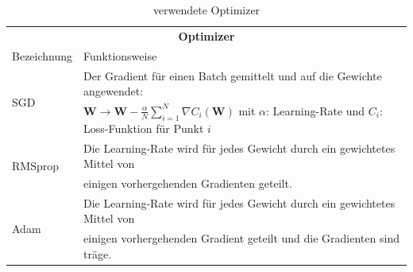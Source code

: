 \begin{table}

	\centering
	\begin{tabular}{ll}
		\multicolumn{2}{c}{\textbf{Optimizer}} \\
		Bezeichnung & Funktionsweise \\
		\hline
		\multirow{2}{*}{SGD}& Der Gradient für einen Batch gemittelt und auf die Gewichte angewendet:\\
		&  $\textbf{W} \rightarrow \textbf{W} - \frac{\alpha}{N}\sum_{i=1}^{N}\nabla C_i(\textbf{W})$ mit $\alpha$: Learning-Rate und $C_i$: Loss-Funktion für Punkt $i$ \\[5pt]
		\multirow{2}{*}{RMSprop\cite{RMSprop}} & Die Learning-Rate wird für jedes Gewicht durch ein gewichtetes Mittel von \\
		& einigen vorhergehenden Gradienten geteilt. \\[5pt]
		\multirow{2}{*}{Adam\cite{Adam}} & Die Learning-Rate wird für jedes Gewicht durch ein gewichtetes Mittel von \\
		&einigen vorhergehenden Gradient geteilt und die Gradienten sind träge. 
	\end{tabular}
	\caption{verwendete Optimizer}
	\label{optimizer}
\end{table}

